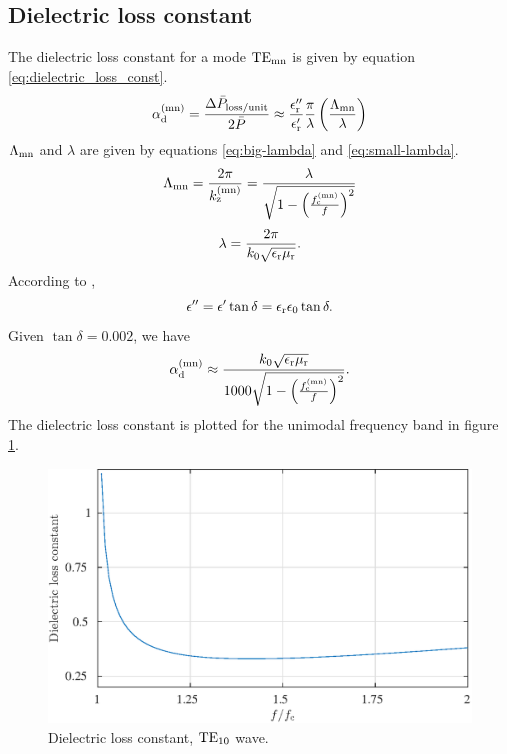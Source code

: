 \subsection{Dielectric loss constant}
The dielectric loss constant for a mode ${\rm TE}_{\rm mn}$ is given by equation \ref{eq:dielectric_loss_const}.
\begin{equation}
\alpha _{\rm d}^{\rm (mn)} = \frac{\Delta \bar P _{\rm loss/unit}}{2 \bar P} \approx \frac{\epsilon _{\rm r}''}{\epsilon _{\rm r}'} \frac{\pi}{\lambda} \left(\frac{\Lambda _{\rm mn}}{\lambda}\right)
\label{eq:dielectric_loss_const}
\end{equation}
$\Lambda _{\rm mn}$ and $\lambda$ are given by equations \ref{eq:big-lambda} and \ref{eq:small-lambda}.
\begin{equation}
\Lambda _{\rm mn} = \frac{2 \pi}{k_{\rm z}^{\rm (mn)}} = \frac{\lambda}{\sqrt{1 - \left(\frac{f_{\rm c}^{\rm (mn)}}{f}\right)^2}}
\label{eq:big-lambda}
\end{equation}
\begin{equation}
\lambda = \frac{2 \pi}{k_{\rm 0} \sqrt{\epsilon_{\rm r} \mu_{\rm r}}}.
\label{eq:small-lambda}
\end{equation}
According to \citep{pozar},
\begin{equation}
\epsilon'' = \epsilon' \tan \delta = \epsilon _{\rm r} \epsilon _{\rm 0} \tan \delta.
\end{equation}
Given $\tan \delta = 0.002$, we have
\begin{equation}
\alpha _{\rm d}^{\rm (mn)} \approx \frac{k_{\rm 0} \sqrt{\epsilon_{\rm r} \mu_{\rm r}}}{1000 \sqrt{1 - \left(\frac{f_{\rm c}^{\rm (mn)}}{f}\right)^2}}.
\end{equation}
The dielectric loss constant is plotted for the unimodal frequency band in figure \ref{fig:dielec_loss_const}.
\begin{figure}[h t b p]
\centering
\includegraphics[width=\textwidth,keepaspectratio]{figures/dielec_loss_const.eps}
\caption{Dielectric loss constant, ${\rm TE}_{\rm 10}$ wave.}
\label{fig:dielec_loss_const}
\end{figure}